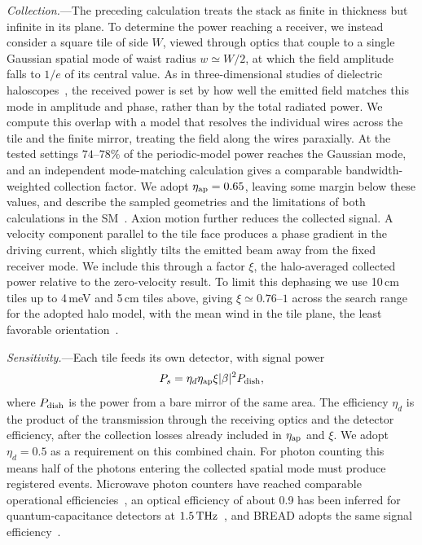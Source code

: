 \documentclass[
  aps,prl,reprint,superscriptaddress,
  amsmath,amssymb,floatfix,nofootinbib
]{revtex4-2}
\begin{document}
\textit{Collection.}---The preceding calculation treats the stack as finite in thickness but infinite in its plane. To determine the power reaching a receiver, we instead consider a square tile of side $W$, viewed through optics that couple to a single Gaussian spatial mode of waist radius $w\simeq W/2$, at which the field amplitude falls to $1/e$ of its central value. As in three-dimensional studies of dielectric haloscopes~\cite{MADMAX:2021lxf}, the received power is set by how well the emitted field matches this mode in amplitude and phase, rather than by the total radiated power. We compute this overlap with a model that resolves the individual wires across the tile and the finite mirror, treating the field along the wires paraxially. At the tested settings $74$--$78\%$ of the periodic-model power reaches the Gaussian mode, and an independent mode-matching calculation gives a comparable bandwidth-weighted collection factor. We adopt $\eta_{\rm ap}=0.65$, leaving some margin below these values, and describe the sampled geometries and the limitations of both calculations in the SM~\cite{SM}. Axion motion further reduces the collected signal. A velocity component parallel to the tile face produces a phase gradient in the driving current, which slightly tilts the emitted beam away from the fixed receiver mode. We include this through a factor $\xi$, the halo-averaged collected power relative to the zero-velocity result. To limit this dephasing we use 10\,cm tiles up to 4\,meV and 5\,cm tiles above, giving $\xi\simeq0.76$--$1$ across the search range for the adopted halo model, with the mean wind in the tile plane, the least favorable orientation~\cite{SM}.

\textit{Sensitivity.}---Each tile feeds its own detector, with signal power
\begin{equation}
P_s=\eta_d\eta_{\rm ap}\xi|\beta|^2P_{\rm dish},
\end{equation}
where $P_{\rm dish}$ is the power from a bare mirror of the same area. The efficiency $\eta_d$ is the product of the transmission through the receiving optics and the detector efficiency, after the collection losses already included in $\eta_{\rm ap}$ and $\xi$. We adopt $\eta_d=0.5$ as a requirement on this combined chain. For photon counting this means half of the photons entering the collected spatial mode must produce registered events. Microwave photon counters have reached comparable operational efficiencies~\cite{Balembois:2023bvs,Braggio:2024xed}, an optical efficiency of about 0.9 has been inferred for quantum-capacitance detectors at $1.5\,{\rm THz}$~\cite{Echternach:2017vtf}, and BREAD adopts the same signal efficiency~\cite{BREAD:2021tpx}.
\end{document}
